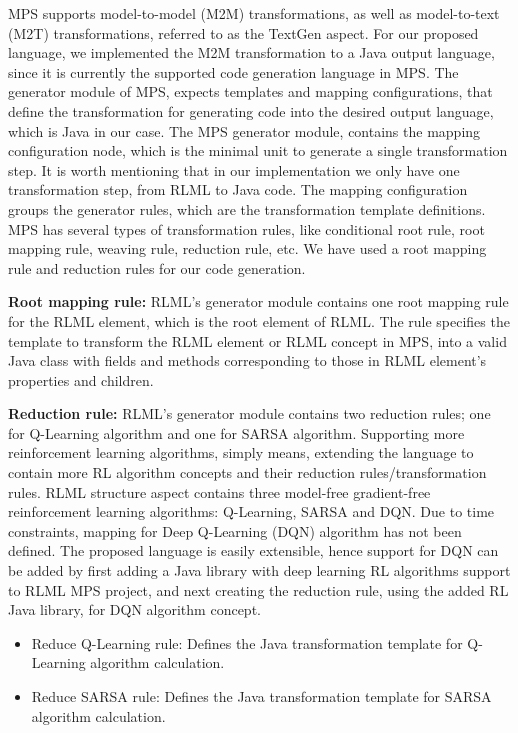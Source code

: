 \documentclass[11pt,letterpaper]{ryersonSGSThesis}
\begin{document}
\begin{ryersonSGSThesis}
        MPS supports model-to-model (M2M) transformations, as well as model-to-text (M2T) transformations, referred to as the TextGen aspect. For our proposed language, we implemented the M2M transformation to a Java output language, since it is currently the supported code generation language in MPS. The generator module of MPS, expects templates and mapping configurations, that define the transformation for generating code into the desired output language, which is Java in our case. The MPS generator module, contains the mapping configuration node, which is the minimal unit to generate a single transformation step. It is worth mentioning that in our implementation we only have one transformation step, from RLML to Java code. The mapping configuration groups the generator rules, which are the transformation template definitions. MPS has several types of transformation rules, like conditional root rule, root mapping rule, weaving rule, reduction rule, etc. We have used a root mapping rule and reduction rules for our code generation.
        
        \textbf{Root mapping rule:} RLML's generator module contains one root mapping rule for the RLML element, which is the root element of RLML. The rule specifies the template to transform the RLML element or RLML concept in MPS, into a valid Java class with fields and methods corresponding to those in RLML element's properties and children.

        \textbf{Reduction rule:} RLML's generator module contains two reduction rules; one for Q-Learning algorithm and one for SARSA algorithm. Supporting more reinforcement learning algorithms, simply means, extending the language to contain more RL algorithm concepts and their reduction rules/transformation rules. RLML structure aspect contains three model-free gradient-free reinforcement learning algorithms: Q-Learning, SARSA and DQN. Due to time constraints, mapping for Deep Q-Learning (DQN) algorithm has not been defined. The proposed language is easily extensible, hence support for DQN can be added by first adding a Java library with deep learning RL algorithms support to RLML MPS project, and next creating the reduction rule, using the added RL Java library, for DQN algorithm concept.
        
        \begin{itemize}
            \item Reduce Q-Learning rule: Defines the Java transformation template for Q-Learning algorithm calculation.
            \item Reduce SARSA rule: Defines the Java transformation template for SARSA algorithm calculation.
        \end{itemize}
        

\end{ryersonSGSThesis}
\end{document}
